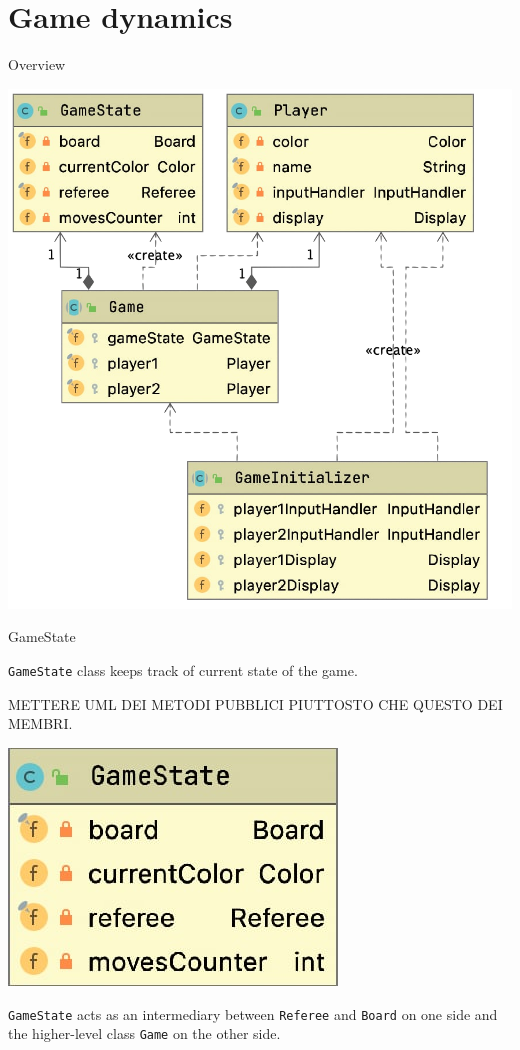 \documentclass{beamer}
\begin{document}
\section{Game dynamics}

\begin{frame}{Overview}
	  \begin{center}
     		\includegraphics[scale=0.25]{images/game_uml.png}
     	\end{center}

\end{frame}

\begin{frame}{GameState}
     
     \texttt{GameState} class keeps track of current state of the game.
     
     METTERE UML DEI METODI PUBBLICI PIUTTOSTO CHE QUESTO DEI MEMBRI.
     \begin{center}
     	\includegraphics[scale=0.32]{images/gamestate.png}
     \end{center}
    
     \vspace{0.4cm}
   \texttt{GameState} acts as an intermediary between \texttt{Referee} and \texttt{Board} on one side and the higher-level class \texttt{Game} on the other 	side.
     
\end{frame}
\end{document}
